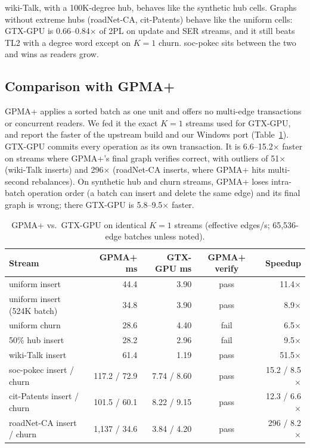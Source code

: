 \documentclass[sigconf,nonacm]{acmart}
\newcommand{\sys}{GTX-GPU}
\begin{document}
wiki-Talk, with a 100K-degree hub, behaves like the synthetic hub cells. Graphs without extreme hubs (roadNet-CA,
cit-Patents) behave like the uniform cells: \sys{} is 0.66--0.84$\times$ of 2PL on update and SER streams, and it still
beats TL2 with a degree word except on $K{=}1$ churn. soc-pokec sits between the two and wins as readers grow.

\subsection{Comparison with GPMA+}
GPMA+ applies a sorted batch as one unit and offers no multi-edge transactions or concurrent readers. We fed it the
exact $K{=}1$ streams used for \sys{}, and report the faster of the upstream build and our Windows port
(Table~\ref{tab:gpma}). \sys{} commits every operation as its own transaction. It is 6.6--15.2$\times$ faster on
streams where GPMA+'s final graph verifies correct, with outliers of 51$\times$ (wiki-Talk inserts) and 296$\times$
(roadNet-CA inserts, where GPMA+ hits multi-second rebalances). On synthetic hub and churn streams, GPMA+ loses
intra-batch operation order (a batch can insert and delete the same edge) and its final graph is wrong; there \sys{} is
5.8--9.5$\times$ faster.

\begin{table}[t]
\caption{GPMA+ vs.\ \sys{} on identical $K{=}1$ streams (effective edges/s; 65,536-edge batches unless noted).}
\label{tab:gpma}
\footnotesize
\setlength{\tabcolsep}{3pt}
\begin{tabular}{@{}lrrcr@{}}
\toprule
Stream & GPMA+ ms & \sys{} ms & GPMA+ verify & Speedup \\
\midrule
uniform insert & 44.4 & 3.90 & pass & 11.4$\times$ \\
uniform insert (524K batch) & 34.8 & 3.90 & pass & 8.9$\times$ \\
uniform churn & 28.6 & 4.40 & fail & 6.5$\times$ \\
50\% hub insert & 28.2 & 2.96 & fail & 9.5$\times$ \\
wiki-Talk insert & 61.4 & 1.19 & pass & 51.5$\times$ \\
soc-pokec insert / churn & 117.2 / 72.9 & 7.74 / 8.60 & pass & 15.2 / 8.5$\times$ \\
cit-Patents insert / churn & 101.5 / 60.1 & 8.22 / 9.15 & pass & 12.3 / 6.6$\times$ \\
roadNet-CA insert / churn & 1,137 / 34.6 & 3.84 / 4.20 & pass & 296 / 8.2$\times$ \\
\bottomrule
\end{tabular}
\end{table}
\end{document}
